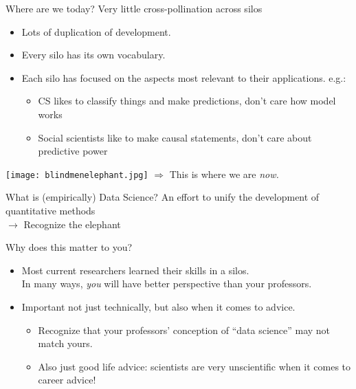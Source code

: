 \documentclass[11pt]{beamer}
\begin{document}
\begin{frame}[c]{Where are we today?}
Very little cross-pollination across silos
\begin{itemize}
	\pause \item Lots of duplication of development.
	\pause \item Every silo has its own vocabulary.
	\pause \item Each silo has focused on the aspects most relevant to their applications. e.g.:
	\begin{itemize}
		\pause \item CS likes to classify things and make predictions, don't care how model works
		\item Social scientists like to make causal statements, don't care about predictive power
	\end{itemize}
\end{itemize}
\end{frame}

\begin{frame}[c]{}
\pause \texttt{[image: blindmenelephant.jpg]}
\pause $\Rightarrow$ This is where we are \emph{now.}
\end{frame}

\begin{frame}[c]{What is (empirically) Data Science?}
\pause An effort to unify the development of quantitative methods \\
\pause $\rightarrow$ Recognize the elephant
\end{frame}

\begin{frame}[c]{Why does this matter to you?}
\begin{itemize}
	\item Most current researchers learned their skills in a silos. \\
	\pause In many ways, \alert{\emph{you} will have better perspective than your professors.}
	\pause \item Important not just technically, but also when it comes to advice.
	\begin{itemize}
		\pause \item Recognize that your professors' conception of ``data science'' \alert{may not match yours}.
		\pause \item Also just good life advice: scientists are \alert{very unscientific} when it comes to career advice!
	\end{itemize}
\end{itemize}
\end{frame}
\end{document}
